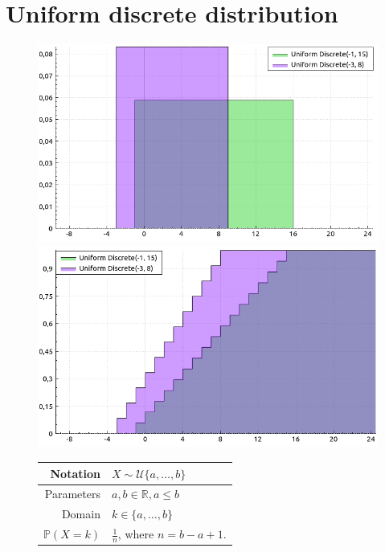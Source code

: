 \documentclass[a4paper,11pt]{article}
\theoremstyle{plain}
\theoremstyle{definition}
\newcommand{\MR}{\mathbb{R}}
\newcommand{\MP}{\mathbb{P}}
\begin{document}
	\section{Uniform discrete distribution}
	\begin{figure}[!htb]\centering
		\begin{minipage}{0.55\textwidth}
			\includegraphics[width=\linewidth, right]{uniform_discrete_pmf}
			\captionsetup{labelformat=empty}
			\includegraphics[width=\linewidth, right]{uniform_discrete_cdf}
			\captionsetup{labelformat=empty}
		\end{minipage}
		\begin{minipage}{0.4\textwidth}
			\begin{tabular}{| r | l |}
				\hline
				Notation & $ X \sim \mathcal{U}\{a, \dots, b\} $ \\
				\hline
				Parameters & $a, b \in \MR, a \leq b$ \\
				\hline
				Domain & $ k \in \{a, \dots, b\} $  \\
				\hline
				$\MP(X = k)$ & $\frac{1}{n} $, where $n=b-a+1$. \\

\end{tabular}
\end{minipage}
\end{figure}
\end{document}

